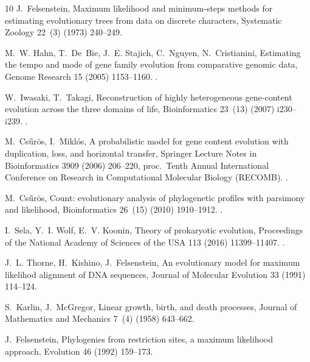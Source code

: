 \documentclass{elsarticle}
\begin{document}
\begin{thebibliography}{10}
J.~Felsenstein, Maximum likelihood and minimum-steps methods for estimating
  evolutionary trees from data on discrete characters, Systematic Zoology
  22~(3) (1973) 240--249.

M.~W. Hahn, T.~De~Bie, J.~E. Stajich, C.~Nguyen, N.~Cristianini, Estimating the
  tempo and mode of gene family evolution from comparative genomic data, Genome
  Research 15 (2005) 1153--1160.
\newblock \href {https://doi.org/10.1101/gr.3567505}
  {}.

W.~Iwasaki, T.~Takagi, Reconstruction of highly heterogeneous gene-content
  evolution across the three domains of life, Bioinformatics 23~(13) (2007)
  i230--i239.
\newblock \href {https://doi.org/10.1093/bioinformatics/btm165}
  {}.

M.~Cs{\H u}r\"os, I.~Mikl\'os, A probabilistic model for gene content evolution
  with duplication, loss, and horizontal transfer, Springer Lecture Notes in
  Bioinformatics 3909 (2006) 206--220, proc.\ Tenth Annual International
  Conference on Research in Computational Molecular Biology (RECOMB).
\newblock \href {https://doi.org/10.1007/11732990_18}
  {}.

M.~Cs\H{u}r\"os, Count: evolutionary analysis of phylogenetic profiles with
  parsimony and likelihood, Bioinformatics 26~(15) (2010) 1910--1912.
\newblock \href {https://doi.org/10.1093/bioinformatics/btq315}
  {}.

I.~Sela, Y.~I. Wolf, E.~V. Koonin, Theory of prokaryotic evolution, Proceedings
  of the National Academy of Sciences of the USA 113 (2016) 11399--11407.
\newblock \href {https://doi.org/10.1073/pnas.1614083113}
  {}.

J.~L. Thorne, H.~Kishino, J.~Felsenstein, An evolutionary model for maximum
  likelihod alignment of {DNA} sequences, Journal of Molecular Evolution 33
  (1991) 114--124.

S.~Karlin, J.~McGregor, Linear growth, birth, and death processes, Journal of
  Mathematics and Mechanics 7~(4) (1958) 643--662.

J.~Felsenstein, Phylogenies from restriction sites, a maximum likelihood
  approach, Evolution 46 (1992) 159--173.

\end{thebibliography}


%
%

\clearpage
\tableofcontents
\end{document}
